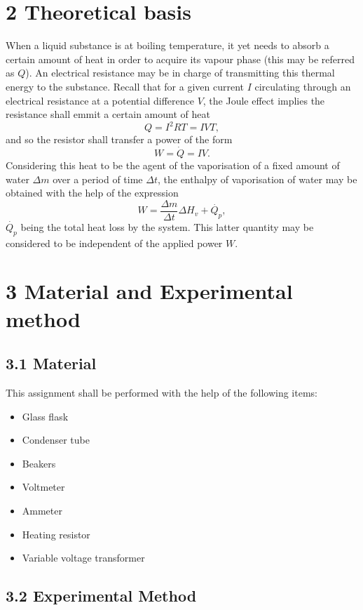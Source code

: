 \documentclass[a4paper, 12pt]{article}
\begin{document}
	\section{2 Theoretical basis}
	When a liquid substance is at boiling temperature, it yet needs to absorb a certain amount of heat in order to acquire its vapour phase (this may be referred as $Q$). An electrical resistance may be in charge of transmitting this thermal energy to the substance. Recall that for a given current $I$ circulating through an electrical resistance at a potential difference $V$, the Joule effect implies the resistance shall emmit a certain amount of heat
	\begin{equation*}\label{qjoule}
		Q = I^2 R T= I V T, 
	\end{equation*}
	and so the resistor shall transfer a power of the form 
	\begin{equation}\label{pjoule}
		W = \dot{Q} = I V.
	\end{equation}
Considering this heat to be the agent of the vaporisation of a fixed amount of water $\Delta m$ over a period of time $\Delta t$, the enthalpy of vaporisation of water may be obtained with the help of the expression
\begin{equation}\label{enthalpprimitive}
	W = \frac{\Delta m}{\Delta t} \Delta H_v + \dot{Q_p},
 \end{equation}
$\dot{Q_p}$ being the total heat loss by the system. This latter quantity may be considered to be independent of the applied power $W$.
\section{3 Material and Experimental method}
\subsection{3.1 Material}
This assignment shall be performed with the help of the following items:
\begin{itemize}
	\item Glass flask
	\item Condenser tube
	\item Beakers
	\item Voltmeter
	\item Ammeter
	\item Heating resistor
	\item Variable voltage transformer
\end{itemize}
\subsection{3.2 Experimental Method}
\end{document}

